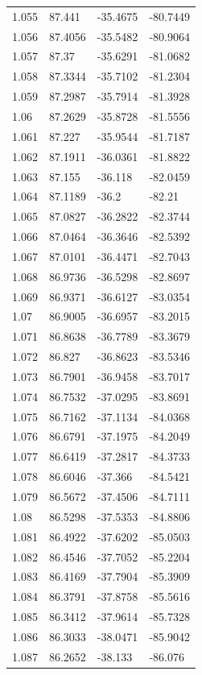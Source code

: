 \begin{tabular}{llll}
1.055 & 87.441 & -35.4675 & -80.7449 \\
1.056 & 87.4056 & -35.5482 & -80.9064 \\
1.057 & 87.37 & -35.6291 & -81.0682 \\
1.058 & 87.3344 & -35.7102 & -81.2304 \\
1.059 & 87.2987 & -35.7914 & -81.3928 \\
1.06 & 87.2629 & -35.8728 & -81.5556 \\
1.061 & 87.227 & -35.9544 & -81.7187 \\
1.062 & 87.1911 & -36.0361 & -81.8822 \\
1.063 & 87.155 & -36.118 & -82.0459 \\
1.064 & 87.1189 & -36.2 & -82.21 \\
1.065 & 87.0827 & -36.2822 & -82.3744 \\
1.066 & 87.0464 & -36.3646 & -82.5392 \\
1.067 & 87.0101 & -36.4471 & -82.7043 \\
1.068 & 86.9736 & -36.5298 & -82.8697 \\
1.069 & 86.9371 & -36.6127 & -83.0354 \\
1.07 & 86.9005 & -36.6957 & -83.2015 \\
1.071 & 86.8638 & -36.7789 & -83.3679 \\
1.072 & 86.827 & -36.8623 & -83.5346 \\
1.073 & 86.7901 & -36.9458 & -83.7017 \\
1.074 & 86.7532 & -37.0295 & -83.8691 \\
1.075 & 86.7162 & -37.1134 & -84.0368 \\
1.076 & 86.6791 & -37.1975 & -84.2049 \\
1.077 & 86.6419 & -37.2817 & -84.3733 \\
1.078 & 86.6046 & -37.366 & -84.5421 \\
1.079 & 86.5672 & -37.4506 & -84.7111 \\
1.08 & 86.5298 & -37.5353 & -84.8806 \\
1.081 & 86.4922 & -37.6202 & -85.0503 \\
1.082 & 86.4546 & -37.7052 & -85.2204 \\
1.083 & 86.4169 & -37.7904 & -85.3909 \\
1.084 & 86.3791 & -37.8758 & -85.5616 \\
1.085 & 86.3412 & -37.9614 & -85.7328 \\
1.086 & 86.3033 & -38.0471 & -85.9042 \\
1.087 & 86.2652 & -38.133 & -86.076 \\

\end{tabular}
